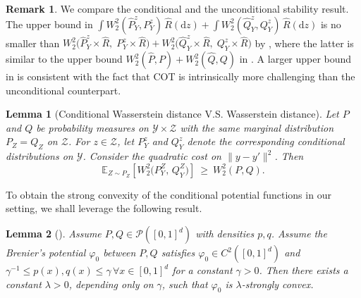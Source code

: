 \documentclass{article}
\theoremstyle{plain}
\newtheorem{lemma}{Lemma}[section]
\theoremstyle{definition}
\newtheorem{remark}{Remark}[section]
\def\PP{P}
\def\QQ{Q}
\def\calP{\mathcal{P}}
\theoremstyle{plain}
\def\calP{\mathcal{P}}
\begin{document}
\begin{remark}
We compare the conditional and the unconditional stability result. The upper bound in  $
\int W_2^2(\widehat \PP_Y^{z}, \PP_Y^z)\,\widehat R(\mathrm dz)
+
\int W_2^2(\widehat \QQ_Y^{z}, \QQ_Y^z)\,\widehat R(\mathrm dz)$ 
is no smaller than 
$W_2^2\!\big(\widehat{\PP}_Y^z\times \widehat R,\;
\PP_Y^z\times \widehat R\big)
+
W_2^2\!\big(\widehat{\QQ}_Y^z\times \widehat R,\;
\QQ_Y^z\times \widehat R\big)$ by , where the latter is similar to the upper bound
$W_2^2(\widehat{\PP},\PP) + W_2^2(\widehat{\QQ},\QQ)$ in .
A larger upper bound in  is consistent with the fact that COT is intrinsically more challenging than the unconditional counterpart.
\end{remark}



\begin{lemma}[Conditional Wasserstein distance V.S. Wasserstein distance]\label{lemm:CW2.V.S.W2}
Let $\PP$ and $\QQ$ be probability measures on $\mathcal{Y}\times\mathcal{Z}$
with the same marginal distribution $\PP_Z = \QQ_Z$ on $\mathcal{Z}$. For $z\in\mathcal{Z}$,
let $\PP_Y^z$ and $\QQ_Y^z$ denote the corresponding
conditional distributions on $\mathcal{Y}$. 
Consider the quadratic cost on
$\|y-y'\|^2$. Then
\[
\mathbb{E}_{Z\sim \PP_Z}\!\left[
W_2^2\!\big(\PP_Y^ Z,\,\QQ_Y^Z\big)
\right]
\ \ge\
W_2^2(\PP,\QQ).
\]
\end{lemma}


To obtain the strong convexity of the conditional potential functions in our setting, we shall leverage the following result.
\begin{lemma}[{\cite[Corollary 3.2]{gigli2011holder}}]\label{lem:convex_lam}
    Assume $P,Q \in \calP([0,1]^d)$ with densities $p,q$. Assume the Brenier's potential $\varphi_0$ between $P,Q$ satisfies $\varphi_0 \in C^2([0,1]^d)$ and $\gamma^{-1} \le p(x),q(x) \le \gamma\, \forall x\in [0,1]^d$ for a constant $\gamma > 0$. 
    Then there exists a constant $\lambda > 0$, depending only on $\gamma$, such that $\varphi_0$ is $\lambda$-strongly convex.
\end{lemma}
\end{document}
